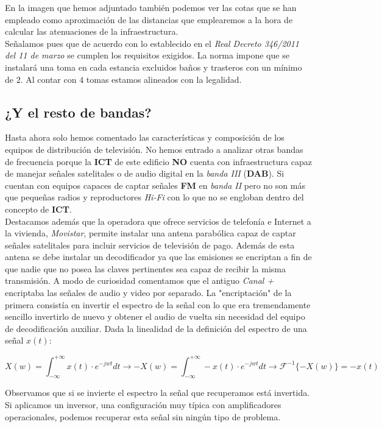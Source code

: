 \documentclass{article}[12 pt]
\begin{document}
			En la imagen que hemos adjuntado también podemos ver las cotas que se han empleado como aproximación de las distancias que emplearemos a la hora de calcular las atenuaciones de la infraestructura.\\

			Señalamos pues que de acuerdo con lo establecido en el \textit{Real Decreto 346/2011 del 11 de marzo} se cumplen los requisitos exigidos. La norma impone que se instalará una toma en cada estancia excluidos baños y trasteros con un mínimo de $2$. Al contar con $4$ tomas estamos alineados con la legalidad.

		\subsection{¿Y el resto de bandas?}
			Hasta ahora solo hemos comentado las características y composición de los equipos de distribución de televisión. No hemos entrado a analizar otras bandas de frecuencia porque la \textbf{ICT} de este edificio \textbf{NO} cuenta con infraestructura capaz de manejar señales satelitales o de audio digital en la \textit{banda III} (\textbf{DAB}). Si cuentan con equipos capaces de captar señales \textbf{FM} en \textit{banda II} pero no son más que pequeñas radios y reproductores \textit{Hi-Fi} con lo que no se engloban dentro del concepto de \textbf{ICT}.\\

			Destacamos además que la operadora que ofrece servicios de telefonía e Internet a la vivienda, \textit{Movistar}, permite instalar una antena parabólica capaz de captar señales satelitales para incluir servicios de televisión de pago. Además de esta antena se debe instalar un decodificador ya que las emisiones se encriptan a fin de que nadie que no posea las claves pertinentes sea capaz de recibir la misma transmisión. A modo de curiosidad comentamos que el antiguo \textit{Canal +} encriptaba las señales de audio y video por separado. La "encriptación" de la primera consistía en invertir el espectro de la señal con lo que era tremendamente sencillo invertirlo de nuevo y obtener el audio de vuelta sin necesidad del equipo de decodificación auxiliar. Dada la linealidad de la definición del espectro de una señal $x(t)$:

			$$X(w) = \int_{-\infty}^{+\infty} x(t) \cdot e^{-jwt}dt \rightarrow -X(w) = \int_{-\infty}^{+\infty} -x(t) \cdot e^{-jwt}dt \rightarrow \mathcal{F}^{-1}\{-X(w)\} = -x(t)$$

			Observamos que si se invierte el espectro la señal que recuperamos está invertida. Si aplicamos un inversor, una configuración muy típica con amplificadores operacionales, podemos recuperar esta señal sin ningún tipo de problema.
\end{document}
